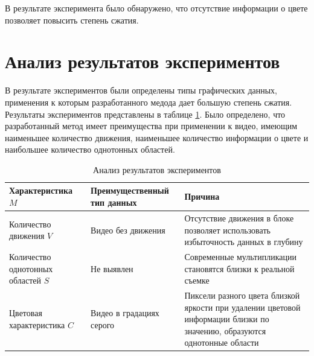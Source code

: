 В результате эксперимента было обнаружено, что отсутствие информации о цвете позволяет повысить степень сжатия. 

\section{Анализ результатов экспериментов}

В результате экспериментов были определены типы графических данных, применения к которым разработанного медода дает большую степень сжатия.
Результаты экспериментов представлены в таблице \ref{tab:tres}. Было определено, что разработанный метод имеет преимущества при применении к видео,
имеющим наименьшее количество движения, наименьшее количество информации о цвете и наибольшее количество однотонных областей.

\begin{table}[ht]
  \caption{Анализ результатов экспериментов}
  \begin{tabular}{|p{4.5cm}|p{4.5cm}|p{4.5cm}|}
  \hline
  Характеристика $M$ & Преимущественный тип данных & Причина \\
  \hline
  Количество движения $V$ & Видео без движения & Отсутствие движения в блоке позволяет использовать избыточность данных в глубину \\
  \hline
  Количество однотонных областей $S$ & Не выявлен & Современные мультипликации становятся близки к реальной съемке \\
  \hline
  Цветовая характеристика $C$ & Видео в градациях серого & Пиксели разного цвета близкой яркости при удалении цветовой информации близки по значению, образуются однотонные области \\
  \hline
  \end{tabular}
  \label{tab:tres}
\end{table}